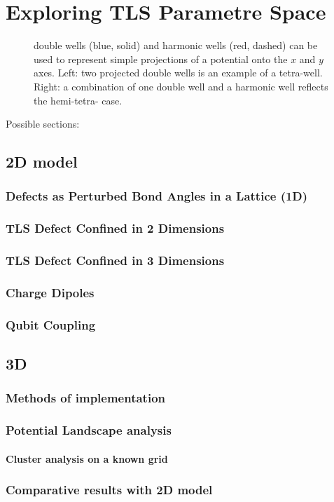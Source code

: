 \versoimage
\chapter{Exploring TLS Parametre Space}\label{ch:implementation}

\begin{figure}[htp]
\centering
\resizebox{0.8\columnwidth}{!}{}
\caption[Potential Projections]{\label{fig:mexhatproj} double wells (blue, solid) and harmonic wells (red, dashed) can be used to represent simple projections of a  potential onto the $x$ and $y$ axes. Left: two projected double wells is an example of a tetra-well. Right: a combination of one double well and a harmonic well reflects the hemi-tetra- case.}
\end{figure}

Possible sections:

\section{2D model}\label{sec:2d}
\subsection{Defects as Perturbed Bond Angles in a Lattice (1D)}
\subsection{TLS Defect Confined in 2 Dimensions}
\subsection{TLS Defect Confined in 3 Dimensions}
\subsection{Charge Dipoles}
\subsection{Qubit Coupling}
\section{3D}
\subsection{Methods of implementation}
\subsection{Potential Landscape analysis}
\subsubsection{Cluster analysis on a known grid}
\subsection{Comparative results with 2D model} 